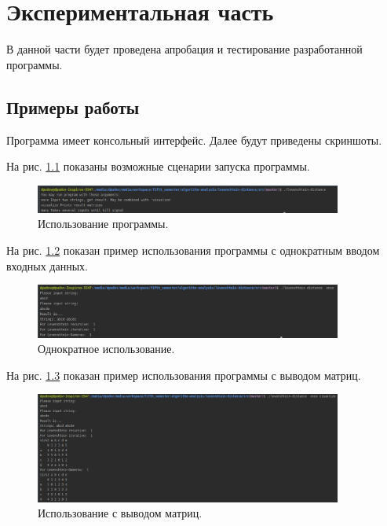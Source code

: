 \chapter{Экспериментальная часть}
\label{cha:research}

В данной части будет проведена апробация и тестирование разработанной программы.

\section{Примеры работы}

Программа имеет консольный интерфейс. Далее будут приведены скриншоты.

На рис. \ref{screenshot-usage} показаны возможные сценарии запуска программы.

\begin{figure}
    \includegraphics[width=0.9\textwidth]{screenshots/screenshot-usage}
    \caption{Использование программы.}
    \label{screenshot-usage}
\end{figure}

На рис. \ref{screenshot-once} показан пример использования программы с однократным вводом входных данных.

\begin{figure}
    \includegraphics[width=0.9\textwidth]{screenshots/screenshot-once}
    \caption{Однократное использование.}
    \label{screenshot-once}
\end{figure}

На рис. \ref{screenshot-visualize} показан пример использования программы с выводом матриц.

\begin{figure}
    \includegraphics[width=0.9\textwidth]{screenshots/screenshot-visualize}
    \caption{Использование с выводом матриц.}
    \label{screenshot-visualize}
\end{figure}

